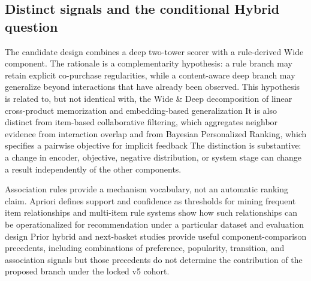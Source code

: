 \documentclass[10pt,a4paper]{article}
\begin{document}
\subsection{Distinct signals and the conditional Hybrid question}

The candidate design combines a deep two-tower scorer with a rule-derived Wide
component. The rationale is a complementarity hypothesis: a rule branch may
retain explicit co-purchase regularities, while a content-aware deep branch may
generalize beyond interactions that have already been observed. This hypothesis
is related to, but not identical with, the Wide \& Deep decomposition of linear
cross-product memorization and embedding-based generalization
\cite{cheng2016_wide_deep} %
It is also distinct from item-based collaborative filtering, which aggregates
neighbor evidence from interaction overlap
\cite{sarwar2001_itemcf} %
and from Bayesian Personalized Ranking, which specifies a pairwise objective
for implicit feedback
\cite{rendle2009_bpr} %
The distinction is substantive: a change in encoder, objective, negative
distribution, or system stage can change a result independently of the other
components.

Association rules provide a mechanism vocabulary, not an automatic ranking
claim. Apriori defines support and confidence as thresholds for mining frequent
item relationships
\cite{agrawal1994_apriori} %
and multi-item rule systems show how such relationships can be operationalized
for recommendation under a particular dataset and evaluation design
\cite{ghoshal2014_multi_item_rules} %
Prior hybrid and next-basket studies provide useful component-comparison
precedents, including combinations of preference, popularity, transition, and
association signals
\cite{liu2009_hybrid_seq_cf} %
\cite{peng2022_ham} %
\cite{peng2023_m2} %
but those precedents do not determine the contribution of the proposed branch
under the locked v5 cohort.
\end{document}
